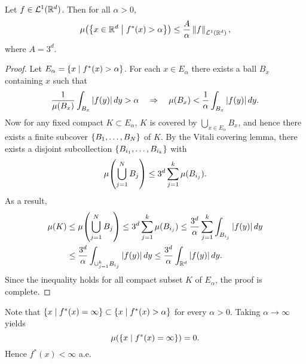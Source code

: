 \begin{theorem}
    Let $f\in\mathcal{L}^1(\mathbb{R}^d)$. Then for all $\alpha>0$, 
    \begin{equation*}
        \mu\pth{\Set{x\in\R^d}{f^*(x)>\alpha}} 
        \leq \frac{A}{\alpha}\norm{f}_{\L^1(\R^d)},
    \end{equation*}
    where $A=3^d$.
\end{theorem}
\begin{proof}
    Let $E_\alpha = \left\{ x \;\middle\vert\; f^*(x)>\alpha \right\}$. For each $x\in E_\alpha$ 
    there exists a ball $B_x$ containing $x$ such that 
    \begin{equation*}
        \frac{1}{\mu(B_x)}\int_{B_x}\left\lvert {f(y)} \right\rvert dy > \alpha
        \quad\Rightarrow\quad 
        \mu(B_x) < \frac{1}{\alpha}\int_{B_x}\left\lvert {f(y)} \right\rvert dy.
    \end{equation*}
    Now for any fixed compact $K\subset E_\alpha$, $K$ is 
    covered by $\bigcup_{x\in E_\alpha} B_x$, and hence there 
    exists a finite subcover $\left\{ {B_1,\ldots,B_N} \right\}$ of $K$. 
    By the Vitali covering lemma, there exists a disjoint 
    subcollection $\left\{ {B_{i_1},\ldots,B_{i_k}} \right\}$ with 
    \begin{equation*}
        \mu\pth{\bigcup_{j=1}^N B_j} \leq 3^d\sum_{j=1}^k \mu(B_{i_j}).
    \end{equation*} 
    As a result,
    \begin{equation*}
        \begin{split}
            \mu(K) &\leq \mu\pth{\bigcup_{j=1}^N B_j} 
            \leq 3^d\sum_{j=1}^k \mu(B_{i_j})
            \leq \frac{3^d}{\alpha}\sum_{j=1}^{k}\int_{B_{i_j}}\abs{f(y)}dy \\
            &\leq \frac{3^d}{\alpha}\int_{\cup_{j=1}^kB_{i_j}}\abs{f(y)}dy
            \leq \frac{3^d}{\alpha}\int_{\R^d}\abs{f(y)}dy.
        \end{split}
    \end{equation*}
    Since the inequality holds for all compact subset $K$ of 
    $E_\alpha$, the proof is complete.
\end{proof}
\begin{remark}
    Note that $\left\{ x \;\middle\vert\; f^*(x)=\infty \right\}\subset\left\{ x \;\middle\vert\; f^*(x)>\alpha \right\}$ for 
    every $\alpha>0$. Taking $\alpha\to\infty$ yields 
    \begin{equation*}
        \mu\pth{\Set{x}{f^*(x)=\infty}}=0.
    \end{equation*}
    Hence $f^*(x)<\infty$ a.e.
\end{remark}

